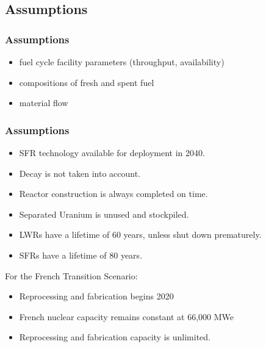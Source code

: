 \subsection{Assumptions}

\begin{frame}
	\frametitle{Assumptions}
	\begin{itemize}
		\item fuel cycle facility parameters (throughput, availability)
		\item compositions of fresh and spent fuel
		\item material flow
	\end{itemize}
\end{frame}

\begin{frame}
	\frametitle{Assumptions}
	\begin{itemize}
		\item SFR technology available for deployment in 2040.
		\item Decay is not taken into account.
		\item Reactor construction is always completed on time.
		\item Separated Uranium is unused and stockpiled.
		\item LWRs have a lifetime of 60 years, unless shut down prematurely.
		\item SFRs have a lifetime of 80 years.
	\end{itemize}
	For the French Transition Scenario:
	\begin{itemize}
		\item Reprocessing and fabrication begins 2020
		\item French nuclear capacity remains constant at 66,000 MWe
		\item Reprocessing and fabrication capacity is unlimited.
	\end{itemize}
\end{frame}

